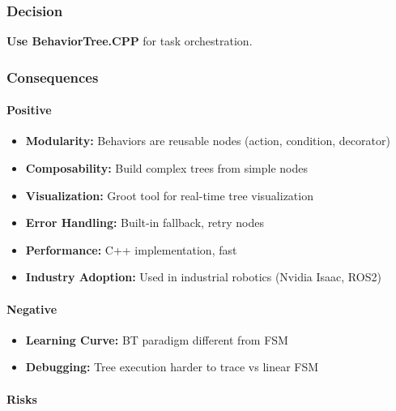 \documentclass[
]{article}
\providecommand{\tightlist}{%
  \setlength{\itemsep}{0pt}\setlength{\parskip}{0pt}}
\begin{document}
\hypertarget{decision-6}{%
\subsubsection{Decision}\label{decision-6}}

\textbf{Use BehaviorTree.CPP} for task orchestration.

\hypertarget{consequences-6}{%
\subsubsection{Consequences}\label{consequences-6}}

\hypertarget{positive-6}{%
\paragraph{Positive}\label{positive-6}}

\begin{itemize}
\tightlist
\item
  \textbf{Modularity:} Behaviors are reusable nodes (action, condition,
  decorator)
\item
  \textbf{Composability:} Build complex trees from simple nodes
\item
  \textbf{Visualization:} Groot tool for real-time tree visualization
\item
  \textbf{Error Handling:} Built-in fallback, retry nodes
\item
  \textbf{Performance:} C++ implementation, fast
\item
  \textbf{Industry Adoption:} Used in industrial robotics (Nvidia Isaac,
  ROS2)
\end{itemize}

\hypertarget{negative-6}{%
\paragraph{Negative}\label{negative-6}}

\begin{itemize}
\tightlist
\item
  \textbf{Learning Curve:} BT paradigm different from FSM
\item
  \textbf{Debugging:} Tree execution harder to trace vs linear FSM
\end{itemize}

\hypertarget{risks-6}{%
\paragraph{Risks}\label{risks-6}}
\end{document}
